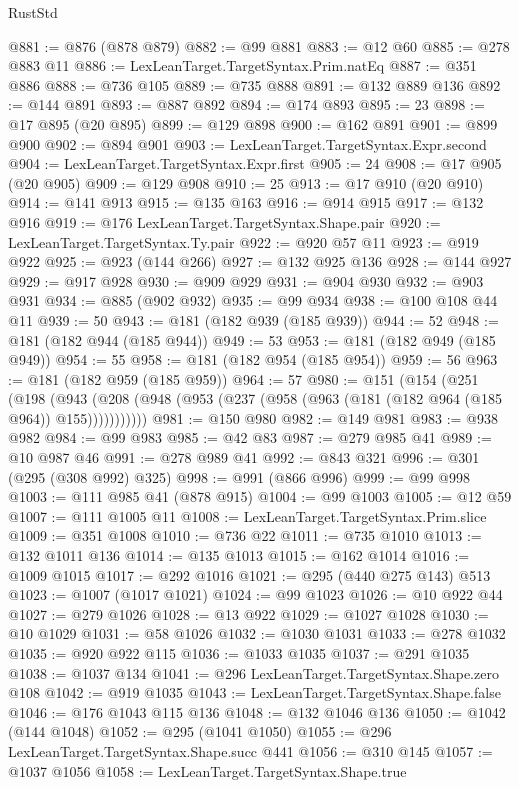 \begin{lexlean}{RustStd}
\begin{coremodule}
{\begin{coremodule}
{{{{{{{{{{{{{{{{{{{{{{{{{{{{{{{@881 := @876 (@878 @879)
@882 := @99 @881
@883 := @12 @60
@885 := @278 @883 @11
@886 := LexLeanTarget.TargetSyntax.Prim.natEq
@887 := @351 @886
@888 := @736 @105
@889 := @735 @888
@891 := @132 @889 @136
@892 := @144 @891
@893 := @887 @892
@894 := @174 @893
@895 := 23
@898 := @17 @895 (@20 @895)
@899 := @129 @898
@900 := @162 @891
@901 := @899 @900
@902 := @894 @901
@903 := LexLeanTarget.TargetSyntax.Expr.second
@904 := LexLeanTarget.TargetSyntax.Expr.first
@905 := 24
@908 := @17 @905 (@20 @905)
@909 := @129 @908
@910 := 25
@913 := @17 @910 (@20 @910)
@914 := @141 @913
@915 := @135 @163
@916 := @914 @915
@917 := @132 @916
@919 := @176 LexLeanTarget.TargetSyntax.Shape.pair
@920 := LexLeanTarget.TargetSyntax.Ty.pair
@922 := @920 @57 @11
@923 := @919 @922
@925 := @923 (@144 @266)
@927 := @132 @925 @136
@928 := @144 @927
@929 := @917 @928
@930 := @909 @929
@931 := @904 @930
@932 := @903 @931
@934 := @885 (@902 @932)
@935 := @99 @934
@938 := @100 @108 @44 @11
@939 := 50
@943 := @181 (@182 @939 (@185 @939))
@944 := 52
@948 := @181 (@182 @944 (@185 @944))
@949 := 53
@953 := @181 (@182 @949 (@185 @949))
@954 := 55
@958 := @181 (@182 @954 (@185 @954))
@959 := 56
@963 := @181 (@182 @959 (@185 @959))
@964 := 57
@980 := @151
    (@154
      (@251
        (@198
          (@943 (@208 (@948 (@953 (@237 (@958 (@963 (@181 (@182 @964 (@185 @964)) @155)))))))))))
@981 := @150 @980
@982 := @149 @981
@983 := @938 @982
@984 := @99 @983
@985 := @42 @83
@987 := @279 @985 @41
@989 := @10 @987 @46
@991 := @278 @989 @41
@992 := @843 @321
@996 := @301 (@295 (@308 @992) @325)
@998 := @991 (@866 @996)
@999 := @99 @998
@1003 := @111 @985 @41 (@878 @915)
@1004 := @99 @1003
@1005 := @12 @59
@1007 := @111 @1005 @11
@1008 := LexLeanTarget.TargetSyntax.Prim.slice
@1009 := @351 @1008
@1010 := @736 @22
@1011 := @735 @1010
@1013 := @132 @1011 @136
@1014 := @135 @1013
@1015 := @162 @1014
@1016 := @1009 @1015
@1017 := @292 @1016
@1021 := @295 (@440 @275 @143) @513
@1023 := @1007 (@1017 @1021)
@1024 := @99 @1023
@1026 := @10 @922 @44
@1027 := @279 @1026
@1028 := @13 @922
@1029 := @1027 @1028
@1030 := @10 @1029
@1031 := @58 @1026
@1032 := @1030 @1031
@1033 := @278 @1032
@1035 := @920 @922 @115
@1036 := @1033 @1035
@1037 := @291 @1035
@1038 := @1037 @134
@1041 := @296 LexLeanTarget.TargetSyntax.Shape.zero @108
@1042 := @919 @1035
@1043 := LexLeanTarget.TargetSyntax.Shape.false
@1046 := @176 @1043 @115 @136
@1048 := @132 @1046 @136
@1050 := @1042 (@144 @1048)
@1052 := @295 (@1041 @1050)
@1055 := @296 LexLeanTarget.TargetSyntax.Shape.succ @441
@1056 := @310 @145
@1057 := @1037 @1056
@1058 := LexLeanTarget.TargetSyntax.Shape.true
}}}}}}}}}}}}}}}}}}}}}}}}}}}}}}}
\end{coremodule}}
\end{coremodule}
\end{lexlean}
